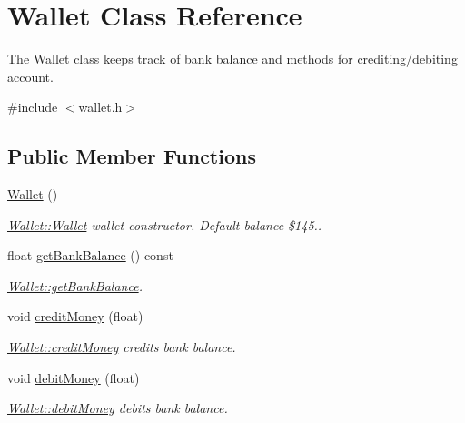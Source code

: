 \hypertarget{classWallet}{}\section{Wallet Class Reference}
\label{classWallet}


The \mbox{\hyperlink{classWallet}{Wallet}} class keeps track of bank balance and methods for crediting/debiting account.  




{\ttfamily \#include $<$wallet.\+h$>$}

\subsection*{Public Member Functions}
\begin{DoxyCompactItemize}
\item 
\mbox{\hyperlink{classWallet_ad9be9e49244b78db9099fcaeccd1af04}{Wallet}} ()
\begin{DoxyCompactList}\small\item\em \mbox{\hyperlink{classWallet_ad9be9e49244b78db9099fcaeccd1af04}{Wallet\+::\+Wallet}} wallet constructor. Default balance \$145.. \end{DoxyCompactList}\item 
float \mbox{\hyperlink{classWallet_a92536035a1de76dc7842693beb93cd24}{get\+Bank\+Balance}} () const
\begin{DoxyCompactList}\small\item\em \mbox{\hyperlink{classWallet_a92536035a1de76dc7842693beb93cd24}{Wallet\+::get\+Bank\+Balance}}. \end{DoxyCompactList}\item 
void \mbox{\hyperlink{classWallet_ab9354b0a8250c0f21b867cc725a33e1e}{credit\+Money}} (float)
\begin{DoxyCompactList}\small\item\em \mbox{\hyperlink{classWallet_ab9354b0a8250c0f21b867cc725a33e1e}{Wallet\+::credit\+Money}} credits bank balance. \end{DoxyCompactList}\item 
void \mbox{\hyperlink{classWallet_a8be722d227a610e4b36b79c2eb04c73f}{debit\+Money}} (float)
\begin{DoxyCompactList}\small\item\em \mbox{\hyperlink{classWallet_a8be722d227a610e4b36b79c2eb04c73f}{Wallet\+::debit\+Money}} debits bank balance. \end{DoxyCompactList}\item 

\end{DoxyCompactItemize}
